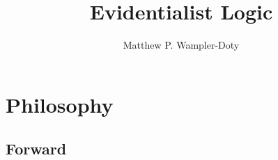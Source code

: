 \documentclass[11pt,titlepage]{report}
\title{Evidentialist Logic}
\author{Matthew P. Wampler-Doty}
\numberwithin{equation}{subsection}
\renewcommand\subsection{\section}
\renewcommand{\Diamond}{\MNSmeddiamond}
\newcommand{\Pos}{\Diamond}
\renewcommand{\phi}{\varphi}
\begin{document}
\maketitle
\pagebreak
\tableofcontents
\pagebreak

\chapter{Philosophy}\label{philosophy}
\subsection{Forward}




\end{document}
